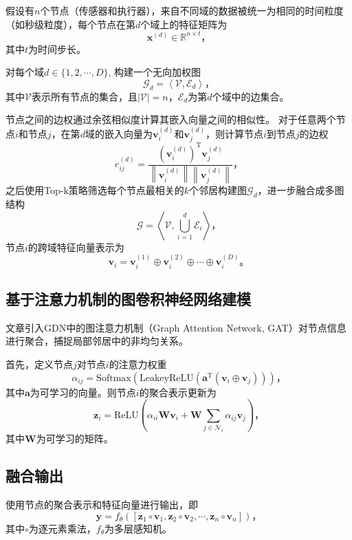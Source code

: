 假设有$n$个节点（传感器和执行器），来自不同域的数据被统一为相同的时间粒度（如秒级粒度），每个节点在第$d$个域上的特征矩阵为
\begin{equation*}
    \bm{x}^{(d)}\in\mathbb{R}^{n\times t} \text{，}
\end{equation*}
其中$t$为时间步长。

对每个域$d\in\{1,2,\cdots,D\}$, 构建一个无向加权图
\begin{equation*}
    \mathcal{G}_d=\left<\mathcal{V},\mathcal{E}_d\right> \text{，}
\end{equation*}
其中$\mathcal{V}$表示所有节点的集合，且$|\mathcal{V}|=n$，$\mathcal{E}_d$为第$d$个域中的边集合。

节点之间的边权通过余弦相似度计算其嵌入向量之间的相似性。
对于任意两个节点$i$和节点$j$，在第$d$域的嵌入向量为$\bm{v}_i^{(d)}$和$\bm{v}_j^{(d)}$，则计算节点$i$到节点$j$的边权
\begin{equation*}
    e_{ij}^{(d)}=\frac{\left(\bm{v}_i^{(d)}\right)^\mathrm{T}\bm{v}_j^{(d)}}{\left\|\bm{v}_i^{(d)}\right\|\left\|\bm{v}_j^{(d)}\right\|} \text{，}
\end{equation*}
之后使用Top-k策略筛选每个节点最相关的$k$个邻居构建图$\mathcal{G}_d$，进一步融合成多图结构
\begin{equation*}
    \mathcal{G}=\left<\mathcal{V}, \textstyle\bigcup_{i=1}^d\mathcal{E}_i\right> \text{，}
\end{equation*}
节点$i$的跨域特征向量表示为
\begin{equation*}
    \bm{v}_i=\bm{v}_i^{(1)}\oplus\bm{v}_i^{(2)}\oplus\cdots\oplus\bm{v}_i^{(D)} \text{。}
\end{equation*}

\subsection{基于注意力机制的图卷积神经网络建模}

文章引入GDN中的图注意力机制（Graph Attention Network, GAT）\cite{velickovic2018graph}对节点信息进行聚合，捕捉局部邻居中的非均匀关系。

首先，定义节点$j$对节点$i$的注意力权重
\begin{equation*}
    \alpha_{ij}=\mathrm{Softmax}\left(\mathrm{LeakeyReLU}\left(\bm{a}^\mathrm{T}(\bm{v}_i\oplus\bm{v}_j)\right)\right) \text{，}
\end{equation*}
其中$\bm{a}$为可学习的向量。则节点$i$的聚合表示更新为
\begin{equation*}
    \bm{z}_i=\mathrm{ReLU}\left(\alpha_{ii}\bm{W}\bm{v}_i+\bm{W}\sum_{j\in\mathcal{N}_i}\alpha_{ij}\bm{v}_j\right) \text{，}
\end{equation*}
其中$\bm{W}$为可学习的矩阵。

\subsection{融合输出}

使用节点的聚合表示和特征向量进行输出，即
\begin{equation*}
    \hat{\bm{y}}=f_\theta([\bm{z}_1\circ\bm{v}_1, \bm{z}_2\circ\bm{v}_2, \cdots, \bm{z}_n\circ\bm{v}_n]) \text{，}
\end{equation*}
其中$\circ$为逐元素乘法，$f_\theta$为多层感知机。
